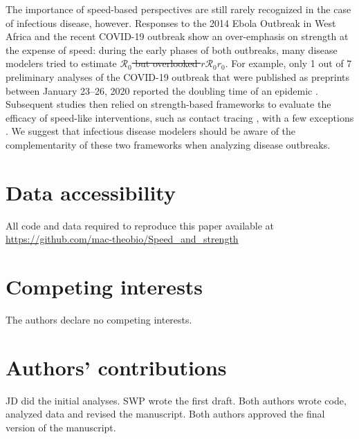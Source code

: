 \documentclass[12pt]{article}
\newcommand{\RR}{\ensuremath{{\mathcal R}}}
\newcommand{\Rx}[1]{\ensuremath{\RR_{\mathrm{#1}}}} %
\newcommand{\Ro}{\Rx{0}} %
\newcommand{\rr}{\ensuremath{{r}}}
\newcommand{\rx}[1]{\ensuremath{\rr_{\mathrm{#1}}}} %
\newcommand{\ro}{\rx{0}} %
\providecommand{\DIFaddtex}[1]{{\protect\color{blue}\uwave{#1}}} %
\providecommand{\DIFdeltex}[1]{{\protect\color{red}\sout{#1}}}                      %
\providecommand{\DIFaddbegin}{} %
\providecommand{\DIFaddend}{} %
\providecommand{\DIFdelbegin}{} %
\providecommand{\DIFdelend}{} %
\providecommand{\DIFadd}[1]{\texorpdfstring{\DIFaddtex{#1}}{#1}} %
\providecommand{\DIFdel}[1]{\texorpdfstring{\DIFdeltex{#1}}{}} %
\newcommand{\DIFscaledelfig}{0.5}
\newlength{\DIFdelgraphicswidth} %
\newlength{\DIFdelgraphicsheight} %
\newcommand{\DIFaddincludegraphics}[2][]{{\color{blue}\fbox{\DIFOincludegraphics[#1]{#2}}}} %
\newcommand{\DIFdelincludegraphics}[2][]{%
\sbox{\DIFdelgraphicsbox}{\DIFOincludegraphics[#1]{#2}}%
\settoboxwidth{\DIFdelgraphicswidth}{\DIFdelgraphicsbox} %
\settoboxtotalheight{\DIFdelgraphicsheight}{\DIFdelgraphicsbox} %
\scalebox{\DIFscaledelfig}{%
\parbox[b]{\DIFdelgraphicswidth}{\usebox{\DIFdelgraphicsbox}\\[-\baselineskip] \rule{\DIFdelgraphicswidth}{0em}}\llap{\resizebox{\DIFdelgraphicswidth}{\DIFdelgraphicsheight}{%
\setlength{\unitlength}{\DIFdelgraphicswidth}%
\begin{picture}(1,1)%
\thicklines\linethickness{2pt} %
{\color[rgb]{1,0,0}\put(0,0){\framebox(1,1){}}}%
{\color[rgb]{1,0,0}\put(0,0){\line( 1,1){1}}}%
{\color[rgb]{1,0,0}\put(0,1){\line(1,-1){1}}}%
\end{picture}%
}\hspace*{3pt}}} %
} %
\DeclareRobustCommand{\DIFaddbegin}{\DIFOaddbegin \let\includegraphics\DIFaddincludegraphics} %
\DeclareRobustCommand{\DIFaddend}{\DIFOaddend \let\includegraphics\DIFOincludegraphics} %
\DeclareRobustCommand{\DIFdelbegin}{\DIFOdelbegin \let\includegraphics\DIFdelincludegraphics} %
\DeclareRobustCommand{\DIFdelend}{\DIFOaddend \let\includegraphics\DIFOincludegraphics} %
\begin{document}
The importance of speed-based perspectives are still rarely recognized in the case of infectious disease, however. 
Responses to the 2014 Ebola Outbreak in West Africa and the recent COVID-19 outbreak show an over-emphasis on strength at the expense of speed:   
during the early phases of both outbreaks, many disease modelers tried to estimate \DIFdelbegin \DIFdel{$\mathcal R_0$ but overlooked $r$}\DIFdelend \DIFaddbegin \Ro\DIFadd{\ but overlooked }\ro\DIFaddend .
For example, only 1 out of 7 preliminary analyses of the COVID-19 outbreak that were published as preprints between January 23--26, 2020 reported the doubling time of an epidemic \citep{bedfordncov, imaincov, liuncov, majumderncov, readncov, riouncov, zhaoncov}.
Subsequent studies then relied on strength-based frameworks to evaluate the efficacy of speed-like interventions, such as contact tracing \cite{hellewell2020feasibility,kretzschmar2020impact,kucharski2020contact}, with a few exceptions \cite{ferretti2020quantifying}.
We suggest that infectious disease modelers should be aware of the complementarity of these two frameworks when analyzing disease outbreaks.



\section*{Data accessibility}

All code and data required to reproduce this paper available at \url{https://github.com/mac-theobio/Speed_and_strength}

\section*{Competing interests}

The authors declare no competing interests.

\section*{Authors’ contributions}

JD did the initial analyses. SWP wrote the first draft. Both authors wrote code, analyzed data and revised the manuscript. Both authors approved the final version of the manuscript.
\end{document}
